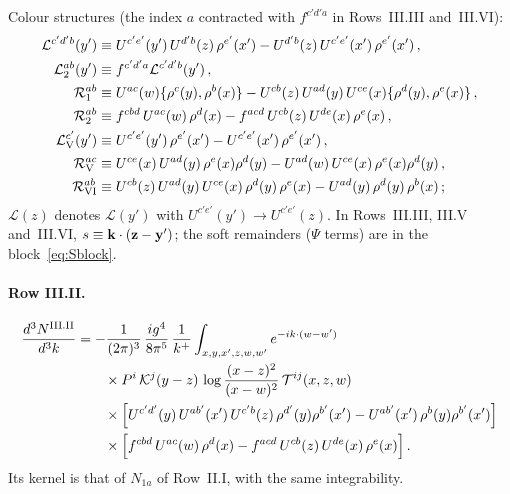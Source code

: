 Colour structures (the index $a$ contracted with $f^{c'd'a}$ in Rows~III.III and~III.VI):
\begin{align}\label{eq:app_G3col}
\mathcal L^{c'd'b}(y')&\equiv U^{c'e'}(y')\,U^{d'b}(z)\,\rho^{e'}(x')-U^{d'b}(z)\,U^{c'e'}(x')\,\rho^{e'}(x')\,,\notag\\
\mathcal L^{ab}_2(y')&\equiv f^{c'd'a}\mathcal L^{c'd'b}(y')\,,\notag\\
\mathcal R_1^{ab}&\equiv U^{ac}(w)\{\rho^c(y),\rho^b(x)\}-U^{cb}(z)\,U^{ad}(y)\,U^{ce}(x)\{\rho^d(y),\rho^e(x)\}\,,\notag\\
\mathcal R_2^{ab}&\equiv f^{cbd}\,U^{ac}(w)\,\rho^d(x)-f^{acd}\,U^{cb}(z)\,U^{de}(x)\,\rho^e(x)\,,\notag\\
\mathcal L_{\rm V}^{c'}(y')&\equiv U^{c'e'}(y')\,\rho^{e'}(x')-U^{c'e'}(x')\,\rho^{e'}(x')\,,\notag\\
\mathcal R_{\rm V}^{ac}&\equiv U^{ce}(x)\,U^{ad}(y)\,\rho^e(x)\rho^d(y)-U^{ad}(w)\,U^{ce}(x)\,\rho^e(x)\rho^d(y)\,,\notag\\
\mathcal R_{\rm VI}^{ab}&\equiv U^{cb}(z)\,U^{ad}(y)\,U^{ce}(x)\,\rho^d(y)\,\rho^e(x)-U^{ad}(y)\,\rho^d(y)\,\rho^b(x)\,;
\end{align}
$\mathcal L(z)$ denotes $\mathcal L(y')$ with $U^{c'e'}(y')\to U^{c'e'}(z)$. In Rows~III.III, III.V and~III.VI, $s\equiv\mathbf{k}\cdot(\mathbf{z}-\mathbf{y}')$; the soft remainders ($\Psi$ terms) are in the block~\eqref{eq:Sblock}.

\paragraph{Row III.II.}
\begin{align}\label{eq:app_IIIII}
\frac{d^3N^{\rm III.II}}{d^3k}&=-\frac{1}{(2\pi)^3}\,\frac{ig^4}{8\pi^5}\,\frac{1}{k^+}\int_{x,y,x',z,w,w'}e^{-ik\cdot(w-w')}\notag\\&\qquad\times P^i\,\mathcal{K}^j(y-z)\,\log\frac{(x-z)^2}{(x-w)^2}\,\mathcal T^{ij}(x,z,w)\notag\\
&\qquad\times\Big[U^{c'd'}(y)\,U^{ab'}(x')\,U^{c'b}(z)\,\rho^{d'}(y)\rho^{b'}(x')-U^{ab'}(x')\,\rho^b(y)\rho^{b'}(x')\Big]\notag\\
&\qquad\times\Big[f^{cbd}\,U^{ac}(w)\,\rho^d(x)-f^{acd}\,U^{cb}(z)\,U^{de}(x)\,\rho^e(x)\Big]\,.
\end{align}
Its kernel is that of $N_{1a}$ of Row~II.I, with the same integrability.

